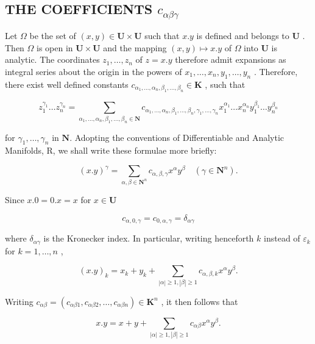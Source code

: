 \subsection{\texorpdfstring{THE COEFFICIENTS \(c_{\alpha\beta\gamma}\)}{THE COEFFICIENTS c\_\{\textbackslash alpha\textbackslash beta\textbackslash gamma\}}}

Let \(\Omega\) be the set of \((x,y)\in\mathbf{U}\times\mathbf{U}\) such that \(x.y\) is defined and belongs to \(\mathbf{U}\) . Then \(\Omega\) is open in \(\mathbf{U}\times\mathbf{U}\) and the mapping \((x,y)\mapsto x.y\) of \(\Omega\) into \(\mathbf{U}\) is analytic. The coordinates \(z_{1},\ldots,z_{n}\) of \(z=x.y\) therefore admit expansions as integral series about the origin in the powers of \(x_{1},\ldots,x_{n},y_{1},\ldots,y_{n}\) . Therefore, there exist well defined constants \(c_{\alpha_{1},\ldots,\alpha_{n},\beta_{1},\ldots,\beta_{n}}\in\mathbf{K}\) , such that

\[
z _ {1} ^ {\gamma_ {1}} \dots z _ {n} ^ {\gamma_ {n}} = \sum_ {\alpha_ {1},\dots,\alpha_ {n},\beta_ {1},\dots,\beta_ {n} \in \mathbf {N}} c _ {\alpha_ {1},\dots,\alpha_ {n},\beta_ {1},\dots,\beta_ {n},\gamma_ {1},\dots,\gamma_ {n}} x _ {1} ^ {\alpha_ {1}} \dots x _ {n} ^ {\alpha_ {n}} y _ {1} ^ {\beta_ {1}} \dots y _ {n} ^ {\beta_ {n}}\tag{1}
\]

for \(\gamma_{1},\ldots,\gamma_{n}\) in \(\mathbf{N}\). Adopting the conventions of Differentiable and Analytic Manifolds, R, we shall write these formulae more briefly:

\[
(x. y) ^ {\gamma} = \sum_ {\alpha , \beta \in \mathbf {N} ^ {n}} c _ {\alpha , \beta , \gamma} x ^ {\alpha} y ^ {\beta} \quad (\gamma \in \mathbf {N} ^ {n}).\tag{2}
\]

Since \(x.0 = 0.x = x\) for \(x\in \mathbf{U}\)

\[
c _ {\alpha , 0, \gamma} = c _ {0, \alpha , \gamma} = \delta_ {\alpha \gamma}\tag{3}
\]

where \(\delta_{\alpha \gamma}\) is the Kronecker index. In particular, writing henceforth \(k\) instead of \(\varepsilon_k\) for \(k = 1, \ldots, n\) ,

\[
(x. y) _ {k} = x _ {k} + y _ {k} + \sum_ {| \alpha | \geqslant 1, | \beta | \geqslant 1} c _ {\alpha , \beta , k} x ^ {\alpha} y ^ {\beta}.\tag{4}
\]

Writing \(c_{\alpha \beta} = (c_{\alpha \beta 1}, c_{\alpha \beta 2}, \ldots, c_{\alpha \beta n}) \in \mathbf{K}^n\) , it then follows that

\[
x. y = x + y + \sum_ {| \alpha | \geqslant 1, | \beta | \geqslant 1} c _ {\alpha \beta} x ^ {\alpha} y ^ {\beta}.\tag{5}
\]

